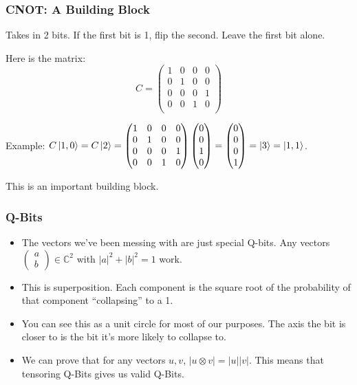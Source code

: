 \documentclass{beamer}
\renewcommand{\C}{\mathbb{C}}
\begin{document}
\begin{frame}
\frametitle{CNOT: A Building Block}
Takes in 2 bits. If the first bit is 1, flip the second. Leave the first bit alone.

Here is the matrix:
\[
    C = 
    \begin{pmatrix}
    1 & 0 & 0 & 0 \\
    0 & 1 & 0 & 0 \\
    0 & 0 & 0 & 1 \\
    0 & 0 & 1 & 0 \\
    \end{pmatrix}
\]

Example: $C \ket{1, 0} = C \ket{2} = \begin{pmatrix} 1 & 0 & 0 & 0 \\ 0 & 1 & 0 & 0 \\ 0 & 0 & 0 & 1 \\ 0 & 0 & 1 & 0 \end{pmatrix} \begin{pmatrix}0 \\ 0 \\ 1 \\ 0 \end{pmatrix} = \begin{pmatrix}0 \\ 0 \\ 0 \\ 1 \end{pmatrix} = \ket{3} = \ket{1,1}$.

This is an important building block.
\end{frame}

\begin{frame}
\frametitle{Q-Bits}
\begin{itemize}
    \item The vectors we've been messing with
are just special Q-bits.
Any vectors $\begin{pmatrix}a\\b\end{pmatrix} \in \C^2$
with $|a|^2 + |b|^2 = 1$ work.

    \item This is superposition. Each component
    is the square root of the probability
    of that component ``collapsing'' to a 1.
    
    \item You can see this as a
    unit circle for most of
    our purposes. The axis the bit
    is closer to is the bit it's
    more likely to collapse to.

    \item We can prove that for any vectors
    $u, v$, $|u \otimes v| = |u| |v|$.
    This means that tensoring Q-Bits
    gives us valid Q-Bits.
\end{itemize}
\end{frame}
\end{document}
